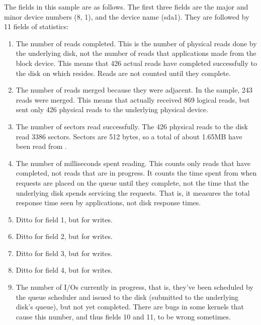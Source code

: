 \documentclass[letterpaper,10pt,english]{sphinxmanual}
\begin{document}
The fields in this sample are as follows.  The first three fields are the major
and minor device numbers (8, 1), and the device name (sda1). They are followed
by 11 fields of statistics:
\begin{enumerate}
%
\item {} 
The number of reads completed.  This is the number of physical reads done by the
underlying disk, not the number of reads that applications made from the block
device.  This means that 426 actual reads have completed successfully to the
disk on which  resides.  Reads are not counted until they complete.

\item {} 
The number of reads merged because they were adjacent.  In the sample, 243 reads
were merged. This means that  actually received 869 logical reads,
but sent only 426 physical reads to the underlying physical device.

\item {} 
The number of sectors read successfully.  The 426 physical reads to the disk
read 3386 sectors.  Sectors are 512 bytes, so a total of about 1.65MB have been
read from .

\item {} 
The number of milliseconds spent reading.  This counts only reads that have
completed, not reads that are in progress.  It counts the time spent from when
requests are placed on the queue until they complete, not the time that the
underlying disk spends servicing the requests. That is, it measures the total
response time seen by applications, not disk response times.

\item {} 
Ditto for field 1, but for writes.

\item {} 
Ditto for field 2, but for writes.

\item {} 
Ditto for field 3, but for writes.

\item {} 
Ditto for field 4, but for writes.

\item {} 
The number of I/Os currently in progress, that is, they’ve been scheduled by the
queue scheduler and issued to the disk (submitted to the underlying disk’s
queue), but not yet completed.  There are bugs in some kernels that cause this
number, and thus fields 10 and 11, to be wrong sometimes.


\end{enumerate}
\end{document}
